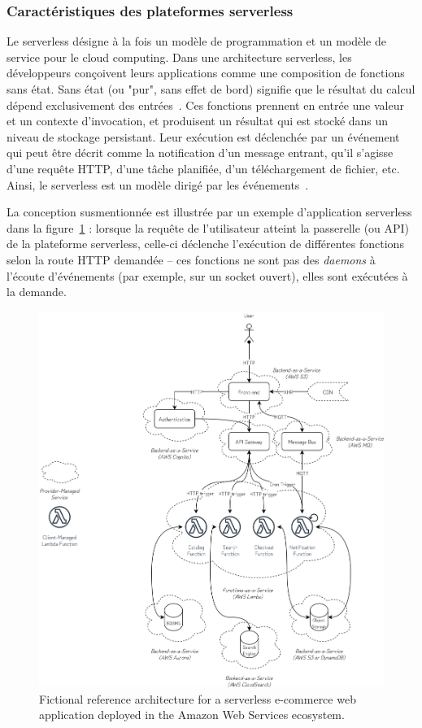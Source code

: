 \subsubsection{Caractéristiques des plateformes serverless}

Le serverless désigne à la fois un modèle de programmation et un modèle de service pour le cloud computing. Dans une architecture serverless, les développeurs conçoivent leurs applications comme une composition de fonctions sans état. Sans état (ou "pur", sans effet de bord) signifie que le résultat du calcul dépend exclusivement des entrées~\cite{burckhardtNetheriteEfficientExecution}. Ces fonctions prennent en entrée une valeur et un contexte d'invocation, et produisent un résultat qui est stocké dans un niveau de stockage persistant. Leur exécution est déclenchée par un événement qui peut être décrit comme la notification d'un message entrant, qu'il s'agisse d'une requête HTTP, d'une tâche planifiée, d'un téléchargement de fichier, etc. Ainsi, le serverless est un modèle dirigé par les événements~\cite{SchleierSmith2021WhatSC}.

La conception susmentionnée est illustrée par un exemple d'application serverless dans la figure~\ref{fig:web-app} : lorsque la requête de l'utilisateur atteint la passerelle (ou API) de la plateforme serverless, celle-ci déclenche l'exécution de différentes fonctions selon la route HTTP demandée -- ces fonctions ne sont pas des \textit{daemons} à l'écoute d'événements (par exemple, sur un socket ouvert), elles sont exécutées à la demande.

\begin{figure}[htbp]
    \centering
	\includegraphics[width=\textwidth]{3_Chapitre1/figures/faas-web-app.png}
	\caption{Fictional reference architecture for a serverless e-commerce web application deployed in the Amazon Web Services ecosystem.}
	\label{fig:web-app}
\end{figure}

